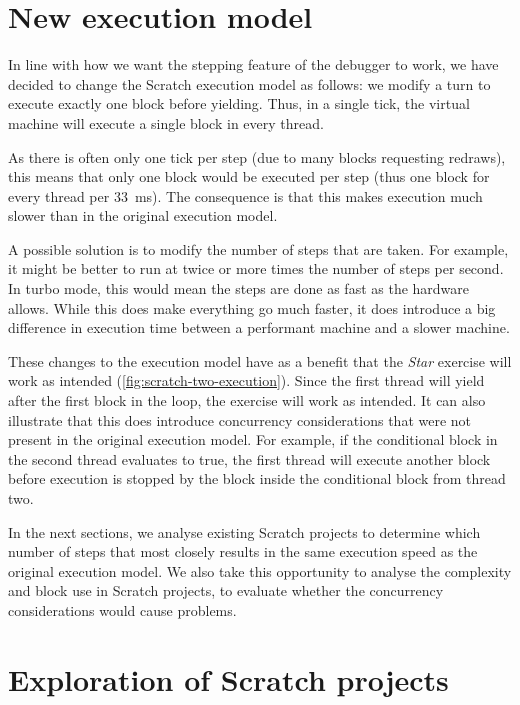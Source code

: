 \documentclass[../main]{subfiles}
\begin{document}
\section{New execution model}\label{sec:a-family-of-new-execution-models}

In line with how we want the stepping feature of the debugger to work, we have decided to change the Scratch execution model as follows: we modify a turn to execute exactly one block before yielding.
Thus, in a single tick, the virtual machine will execute a single block in every thread.

As there is often only one tick per step (due to many blocks requesting redraws), this means that only one block would be executed per step (thus one block for every thread per \qty{33}{\milli\second}).
The consequence is that this makes execution much slower than in the original execution model.

A possible solution is to modify the number of steps that are taken.
For example, it might be better to run at twice or more times the number of steps per second.
In turbo mode, this would mean the steps are done as fast as the hardware allows.
While this does make everything go much faster, it does introduce a big difference in execution time between a performant machine and a slower machine.

These changes to the execution model have as a benefit that the \emph{Star} exercise will work as intended (\cref{fig:scratch-two-execution}).
Since the first thread will yield after the first block in the loop, the exercise will work as intended.
It can also illustrate that this does introduce concurrency considerations that were not present in the original execution model.
For example, if the conditional block in the second thread evaluates to true, the first thread will execute another block before execution is stopped by the block inside the conditional block from thread two.


In the next sections, we analyse existing Scratch projects to determine which number of steps that most closely results in the same execution speed as the original execution model.
We also take this opportunity to analyse the complexity and block use in Scratch projects, to evaluate whether the concurrency considerations would cause problems.

\section{Exploration of Scratch projects}\label{sec:evaluation-of-scratch-projects}
\end{document}
